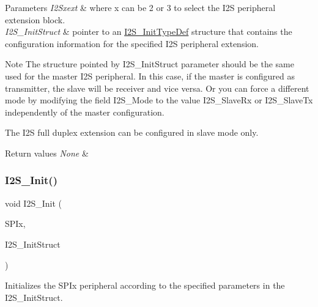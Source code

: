 \begin{DoxyParams}{Parameters}
{\em I2\+Sxext} & where x can be 2 or 3 to select the I2S peripheral extension block. \\
\hline
{\em I2\+S\+\_\+\+Init\+Struct} & pointer to an \mbox{\hyperlink{struct_i2_s___init_type_def}{I2\+S\+\_\+\+Init\+Type\+Def}} structure that contains the configuration information for the specified I2S peripheral extension.\\
\hline
\end{DoxyParams}
\begin{DoxyNote}{Note}
The structure pointed by I2\+S\+\_\+\+Init\+Struct parameter should be the same used for the master I2S peripheral. In this case, if the master is configured as transmitter, the slave will be receiver and vice versa. Or you can force a different mode by modifying the field I2\+S\+\_\+\+Mode to the value I2\+S\+\_\+\+Slave\+Rx or I2\+S\+\_\+\+Slave\+Tx independently of the master configuration. ~\newline
 

The I2S full duplex extension can be configured in slave mode only. ~\newline
 
\end{DoxyNote}

\begin{DoxyRetVals}{Return values}
{\em None} & \\
\hline
\end{DoxyRetVals}
\mbox{\label{group___s_p_i_ga53661884ae4a9640df7cbc59187782f7}} 
\subsubsection{\texorpdfstring{I2\+S\+\_\+\+Init()}{I2S\_Init()}}
{\footnotesize\ttfamily void I2\+S\+\_\+\+Init (\begin{DoxyParamCaption}\item[{S\+P\+I\+\_\+\+Type\+Def $\ast$}]{S\+P\+Ix,  }\item[{\mbox{\hyperlink{struct_i2_s___init_type_def}{I2\+S\+\_\+\+Init\+Type\+Def}} $\ast$}]{I2\+S\+\_\+\+Init\+Struct }\end{DoxyParamCaption})}



Initializes the S\+P\+Ix peripheral according to the specified parameters in the I2\+S\+\_\+\+Init\+Struct. 


